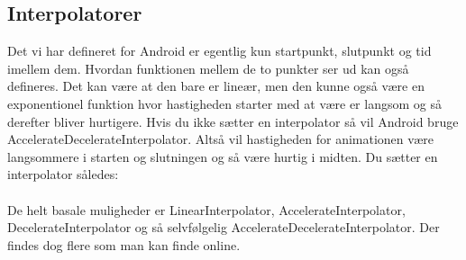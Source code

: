 \subsection{Interpolatorer}
Det vi har defineret for Android er egentlig kun startpunkt, slutpunkt og tid imellem dem. Hvordan funktionen mellem de to punkter ser ud kan også defineres. Det kan være at den bare er lineær, men den kunne også være en exponentionel funktion hvor hastigheden starter med at være er langsom og så derefter bliver hurtigere. 
Hvis du ikke sætter en interpolator så vil Android bruge AccelerateDecelerateInterpolator. Altså vil hastigheden for animationen være langsommere i starten og slutningen og så være hurtig i midten. Du sætter en interpolator således: \\
\\
De helt basale muligheder er LinearInterpolator, AccelerateInterpolator, DecelerateInterpolator og så selvfølgelig AccelerateDecelerateInterpolator. Der findes dog flere som man kan finde online.
